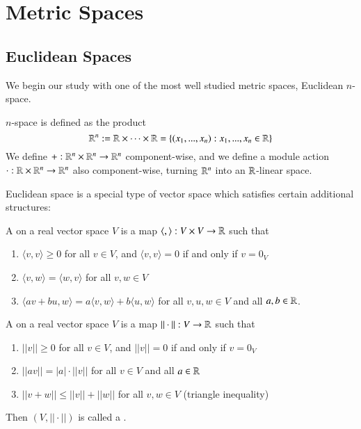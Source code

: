 \chapter{Metric Spaces}\label{Metrics}

\section{Euclidean Spaces}

We begin our study with one of the most well studied metric spaces, Euclidean $n$-space.

\begin{definition}
     $n$-space is defined as the product \begin{equation*}
        \mathbb R^n := \mathbb R\times \cdots \times \mathbb R = \{(x_1,...,x_n):x_1,...,x_n \in \mathbb R\}
    \end{equation*}
    We define $+:\mathbb R^n\times \mathbb R^n\rightarrow \mathbb R^n$ component-wise, and we define a module action $\cdot:\mathbb R\times \mathbb R^n\rightarrow \mathbb R^n$ also component-wise, turning $\mathbb R^n$ into an $\mathbb R$-linear space.
\end{definition}

Euclidean space is a special type of vector space which satisfies certain additional structures:

\begin{definition}
    A  on a real vector space $V$ is a map $\langle , \rangle: V\times V\rightarrow \mathbb R$ such that \begin{enumerate}
        \item $\langle v,v\rangle \geq 0$ for all $v \in V$, and $\langle v,v\rangle = 0$ if and only if $v = 0_V$
        \item $\langle v,w\rangle = \langle w,v\rangle$ for all $v,w \in V$
        \item $\langle av+bu,w\rangle = a\langle v,w\rangle + b\langle u,w\rangle$ for all $v,u,w \in V$ and all $a,b \in \mathbb R$.
    \end{enumerate}
\end{definition}

\begin{definition}
    A  on a real vector space $V$ is a map $||\cdot||:V\rightarrow \mathbb R$ such that \begin{enumerate}
        \item $|| v|| \geq 0$ for all $v \in V$, and $||v|| = 0$ if and only if $v = 0_V$
        \item $||av|| = |a|\cdot||v||$ for all $v \in V$ and all $a \in \mathbb R$
        \item $||v+w|| \leq ||v|| + ||w||$ for all $v,w \in V$ (triangle inequality)
    \end{enumerate}
    Then $(V,||\cdot||)$ is called a .
\end{definition}

